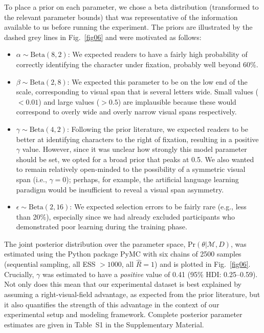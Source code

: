 \documentclass[doc,biblatex]{apa7}
\begin{document}
To place a prior on each parameter, we chose a beta distribution (transformed to the relevant parameter bounds) that was representative of the information available to us before running the experiment. The priors are illustrated by the dashed grey lines in Fig.~\ref{fig06} and were motivated as follows:
\begin{itemize}
    \item $\alpha \sim \mathrm{Beta}(8, 2)$: We expected readers to have a fairly high probability of correctly identifying the character under fixation, probably well beyond 60\%.
    \item $\beta \sim \mathrm{Beta}(2, 8)$: We expected this parameter to be on the low end of the scale, corresponding to visual span that is several letters wide. Small values ($< 0.01$) and large values ($> 0.5$) are implausible because these would correspond to overly wide and overly narrow visual spans respectively.
    \item $\gamma \sim \mathrm{Beta}(4, 2)$: Following the prior literature, we expected readers to be better at identifying characters to the right of fixation, resulting in a positive $\gamma$ value. However, since it was unclear how strongly this model parameter should be set, we opted for a broad prior that peaks at 0.5. We also wanted to remain relatively open-minded to the possibility of a symmetric visual span (i.e., $\gamma = 0$); perhaps, for example, the artificial language learning paradigm would be insufficient to reveal a visual span asymmetry.
    \item $\epsilon \sim \mathrm{Beta}(2, 16)$: We expected selection errors to be fairly rare (e.g., less than 20\%), especially since we had already excluded participants who demonstrated poor learning during the training phase.
\end{itemize}

The joint posterior distribution over the parameter space, $\mathrm{Pr}(\theta|\mathcal{M},D)$, was estimated using the Python package PyMC with six chains of 2500 samples (sequential sampling, all ESS $> 1000$, all $\hat{R}=1$) and is plotted in Fig.~\ref{fig06}. Crucially, $\gamma$ was estimated to have a \textit{positive} value of 0.41 (95\% HDI: 0.25--0.59). Not only does this mean that our experimental dataset is best explained by assuming a right-visual-field advantage, as expected from the prior literature, but it also quantifies the strength of this advantage in the context of our experimental setup and modeling framework. Complete posterior parameter estimates are given in Table~S1 in the Supplementary Material.
\end{document}

